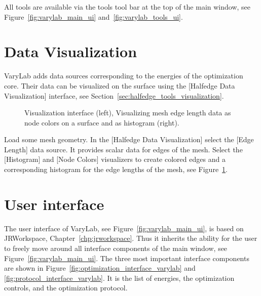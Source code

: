 \documentclass[Thesis.tex]{subfiles}
\begin{document}
All tools are available via the tools tool bar at the top of the main window, see Figure~\ref{fig:varylab_main_ui} and~\ref{fig:varylab_tools_ui}.

\section{Data Visualization}

{\sc VaryLab} adds data sources corresponding to the energies of the optimization core. Their data can be visualized on the surface using the [Halfedge Data Visualization] interface, see Section~\ref{sec:halfedge_tools_visualization}. 

\begin{figure}
    \begin{center}
    \caption{Visualization interface (left), Visualizing mesh edge length data as node colors on a surface and as histogram (right).}
    \label{fig:visualizing_edge_lengths}
    \end{center}
\end{figure}

\begin{example} Load some mesh geometry. In the [Halfedge Data Visualization] select the [Edge Length] data source. It provides scalar data for edges of the mesh. Select the [Histogram] and [Node Colors] visualizers to create colored edges and a corresponding histogram for the edge lengths of the mesh, see Figure~\ref{fig:visualizing_edge_lengths}.
\end{example}

\section{User interface}
\label{sec:ui_varylab}

The user interface of {\sc VaryLab}, see Figure~\ref{fig:varylab_main_ui}, is based on {\sc JRWorkspace}, Chapter~\ref{chp:jrworkspace}. Thus it inherits the ability for the user to freely move around all interface components of the main window, see Figure~\ref{fig:varylab_main_ui}. 
The three most important interface components are shown in Figure~\ref{fig:optimization_interface_varylab} and \ref{fig:protocol_interface_varylab}. It is the list of energies, the optimization controls, and the optimization protocol.
\end{document}
